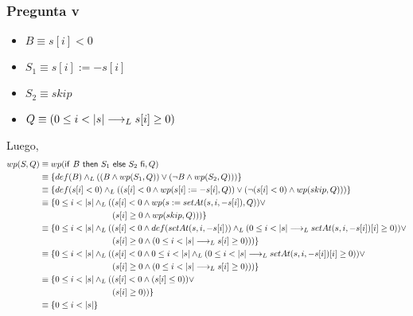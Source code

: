 \subsubsection{Pregunta v}
\begin{itemize}
    \item $ B \equiv s[i] < 0 $
    \item $ S_1 \equiv s[i] := -s[i] $
    \item $ S_2 \equiv skip $
    \item $ Q \equiv (0 \leq i < |s| \longrightarrow _L s[i] \geq 0) $
\end{itemize}
Luego,
\begin{align*}
    wp(S, Q) &\equiv wp(\mathsf{if}\ B\ \mathsf{then}\ S_1\ \mathsf{else}\ S_2\ \mathsf{fi}, Q) \\
    &\equiv \{ def(B) \land _L ((B \wedge wp(S_1, Q)) \vee (\neg B \wedge wp(S_2, Q))) \} \\
    &\equiv \{ def(s[i] < 0) \land _L ((s[i] < 0 \wedge wp(s[i] := -s[i], Q)) \vee (\neg (s[i] < 0) \wedge wp(skip, Q))) \} \\
    &\equiv \{ 0 \leq i < |s| \land _L ((s[i] < 0 \wedge wp(s:=setAt(s, i, -s[i]), Q)) \vee \\
    &\qquad \qquad \qquad \qquad \; \; (s[i] \geq 0 \wedge wp(skip, Q))) \} \\
    &\equiv \{ 0 \leq i < |s| \land _L ((s[i] < 0 \wedge def(setAt(s, i, -s[i])) \land _L (0 \leq i < |s| \longrightarrow _L setAt(s, i, -s[i])[i] \geq 0)) \vee \\
    &\qquad \qquad \qquad \qquad \; \; (s[i] \geq 0 \wedge (0 \leq i < |s| \longrightarrow _L s[i] \geq 0))) \} \\
    &\equiv \{ 0 \leq i < |s| \land _L ((s[i] < 0 \wedge 0 \leq i < |s| \land _L (0 \leq i < |s| \longrightarrow _L setAt(s, i, -s[i])[i] \geq 0)) \vee \\
    &\qquad \qquad \qquad \qquad \; \; (s[i] \geq 0 \wedge (0 \leq i < |s| \longrightarrow _L s[i] \geq 0))) \} \\
    &\equiv \{ 0 \leq i < |s| \land _L ((s[i] < 0 \wedge (s[i] \leq 0)) \vee \\
    &\qquad \qquad \qquad \qquad \; \; (s[i] \geq 0)) \} \\
    &\equiv \{ 0 \leq i < |s| \} \\
\end{align*}


